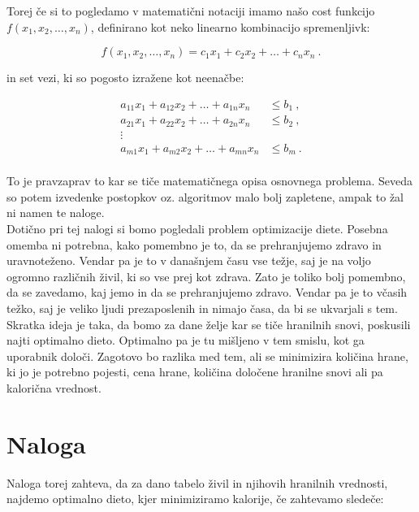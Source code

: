 \documentclass[a4paper]{article}
\begin{document}
Torej če si to pogledamo v matematični notaciji imamo našo cost funkcijo $f(x_1, x_2, \dots, x_n)$, 
definirano kot neko linearno kombinacijo spremenljivk:

\begin{equation}
    f(x_1, x_2, \dots, x_n) = c_1x_1 + c_2x_2 + \dots + c_nx_n\>.
\end{equation}

in set vezi, ki so pogosto izražene kot neenačbe:

\begin{equation}
    \begin{split}
        a_{11}x_1 + a_{12}x_2 + \dots + a_{1n}x_n &\leq b_1\>, \\
        a_{21}x_1 + a_{22}x_2 + \dots + a_{2n}x_n &\leq b_2\>, \\
        \vdots \qquad \qquad \quad\\
        a_{m1}x_1 + a_{m2}x_2 + \dots + a_{mn}x_n &\leq b_m\>. \\
    \end{split}
\end{equation}

To je pravzaprav to kar se tiče matematičnega opisa osnovnega problema. Seveda so potem izvedenke postopkov
oz. algoritmov malo bolj zapletene, ampak to žal ni namen te naloge. \\

Dotično pri tej nalogi si bomo pogledali problem optimizacije diete. Posebna omemba ni potrebna, kako 
pomembno je to, da se prehranjujemo zdravo in uravnoteženo. Vendar pa je to v današnjem času vse težje,
saj je na voljo ogromno različnih živil, ki so vse prej kot zdrava. Zato je toliko bolj pomembno, da
se zavedamo, kaj jemo in da se prehranjujemo zdravo. Vendar pa je to včasih težko, saj je veliko ljudi
prezaposlenih in nimajo časa, da bi se ukvarjali s tem. Skratka ideja je taka, da bomo za dane želje 
kar se tiče hranilnih snovi, poskusili najti optimalno dieto. Optimalno pa je tu mišljeno v tem smislu,
kot ga uporabnik določi. Zagotovo bo razlika med tem, ali se minimizira količina hrane, ki jo je potrebno
pojesti, cena hrane, količina določene hranilne snovi ali pa kalorična vrednost. 

\section{Naloga}
Naloga torej zahteva, da za dano tabelo živil in njihovih hranilnih vrednosti, najdemo optimalno dieto, kjer minimiziramo
kalorije, če zahtevamo sledeče:
\end{document}
